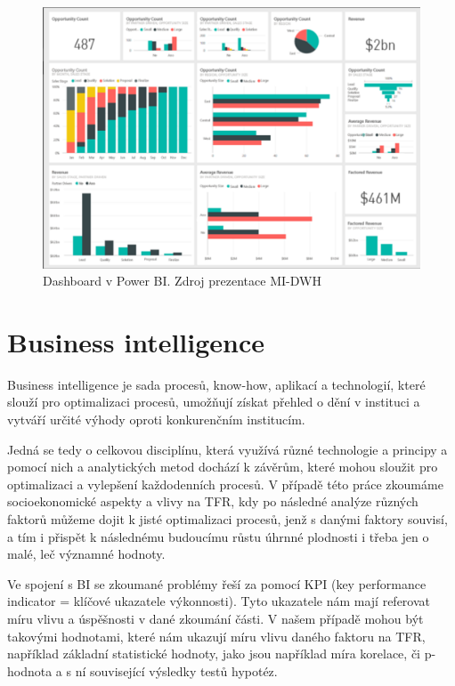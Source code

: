 \documentclass[thesis=M,czech]{FITthesis}[2022/10/08]
\begin{document}
\begin{figure}
    \centering
    \includegraphics[width=\textwidth]{DP-obrazky/dashboard_rnd.png}
    \caption{Dashboard v Power BI. Zdroj prezentace MI-DWH \cite{EDW5}}
    \label{fig:Dashboard_př}
\end{figure}




\section{Business intelligence}

Business intelligence je sada procesů, know-how, aplikací a technologií, které slouží pro optimalizaci procesů, umožňují získat přehled o dění v instituci a vytváří určité výhody oproti konkurenčním institucím.

Jedná se tedy o celkovou disciplínu, která využívá různé technologie a principy a pomocí nich a analytických metod dochází k závěrům, které mohou sloužit pro optimalizaci a vylepšení každodenních procesů. V případě této práce zkoumáme socioekonomické aspekty a vlivy na TFR, kdy po následné analýze různých faktorů můžeme dojit k jisté optimalizaci procesů, jenž s danými faktory souvisí, a tím i přispět k následnému budoucímu růstu úhrnné plodnosti i třeba jen o malé, leč významné hodnoty.

Ve spojení s BI se zkoumané problémy řeší za pomocí KPI (key performance indicator = klíčové ukazatele výkonnosti). Tyto ukazatele nám mají referovat míru vlivu a úspěšnosti v dané zkoumání části. V našem případě mohou být takovými hodnotami, které nám ukazují míru vlivu daného faktoru na TFR, například základní statistické hodnoty, jako jsou například míra korelace, či p-hodnota a s ní související výsledky testů hypotéz. \cite{EDW1}
\end{document}
